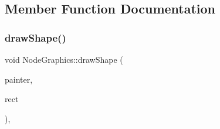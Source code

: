 \subsection{Member Function Documentation}
\mbox{\label{class_node_graphics_a6befa2f5ffc0c7efb4e56bc0c0aeff96}} 
\subsubsection{\texorpdfstring{drawShape()}{drawShape()}}
{\footnotesize\ttfamily void Node\+Graphics\+::draw\+Shape (\begin{DoxyParamCaption}\item[{Q\+Painter \&}]{painter,  }\item[{const qmapcontrol\+::\+Rect\+World\+Px \&}]{rect }\end{DoxyParamCaption})\hspace{0.3cm}{\ttfamily [protected]}, {\ttfamily [virtual]}}



